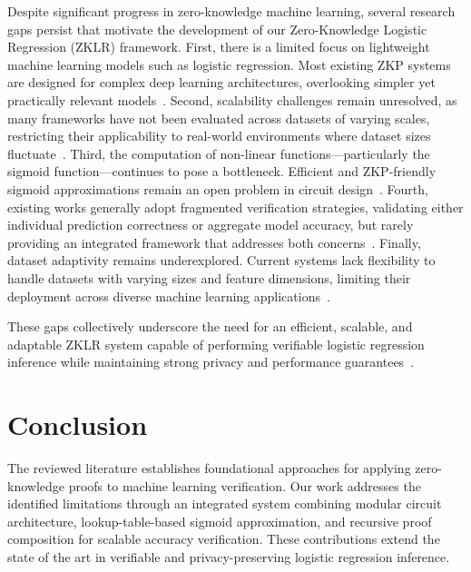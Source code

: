 Despite significant progress in zero-knowledge machine learning, several research gaps persist that motivate the development of our Zero-Knowledge Logistic Regression (ZKLR) framework.  
First, there is a limited focus on lightweight machine learning models such as logistic regression. Most existing ZKP systems are designed for complex deep learning architectures, overlooking simpler yet practically relevant models~\cite{cryptoeprint:2023/1174}.  
Second, scalability challenges remain unresolved, as many frameworks have not been evaluated across datasets of varying scales, restricting their applicability to real-world environments where dataset sizes fluctuate~\cite{cryptoeprint:2021/730}.  
Third, the computation of non-linear functions—particularly the sigmoid function—continues to pose a bottleneck. Efficient and ZKP-friendly sigmoid approximations remain an open problem in circuit design~\cite{cryptoeprint:2025/507}.  
Fourth, existing works generally adopt fragmented verification strategies, validating either individual prediction correctness or aggregate model accuracy, but rarely providing an integrated framework that addresses both concerns~\cite{10.1145/3372297.3417278}. 
Finally, dataset adaptivity remains underexplored. Current systems lack flexibility to handle datasets with varying sizes and feature dimensions, limiting their deployment across diverse machine learning applications~\cite{article}.

These gaps collectively underscore the need for an efficient, scalable, and adaptable ZKLR system capable of performing verifiable logistic regression inference while maintaining strong privacy and performance guarantees~\cite{kates2020plonk}.

\section{Conclusion}

The reviewed literature establishes foundational approaches for applying zero-knowledge proofs to machine learning verification. Our work addresses the identified limitations through an integrated system combining modular circuit architecture, lookup-table-based sigmoid approximation, and recursive proof composition for scalable accuracy verification. These contributions extend the state of the art in verifiable and privacy-preserving logistic regression inference.

\clearpage
